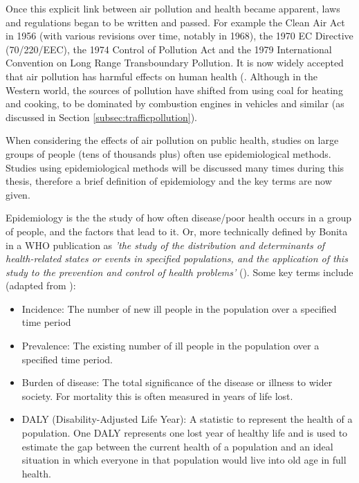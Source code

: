 
Once this explicit link between air pollution and health became apparent, laws and regulations began to be written and passed. For example the Clean Air Act in 1956 (with various revisions over time, notably in 1968), the 1970 EC Directive (70/220/EEC), the 1974 Control of Pollution Act and the 1979 International Convention on Long Range Transboundary Pollution.
It is now widely accepted that air pollution has harmful effects on human health (\cite{WorldHealthOrganization2013}. Although in the Western world, the sources of pollution have shifted from using coal for heating and cooking, to be dominated by combustion engines in vehicles and similar (as discussed in Section \ref{subsec:trafficpollution}).


When considering the effects of air pollution on public health, studies on large groups of people (tens of thousands plus) often use epidemiological methods. Studies using epidemiological methods will be discussed many times during this thesis, therefore a brief definition of epidemiology and the key terms are now given.

Epidemiology is the the study of how often disease/poor health occurs in a group of people, and the factors that lead to it. Or, more technically defined by Bonita in a WHO publication as \textit{'the study of the distribution and determinants of health-related states or events in specified populations, and the application of this study to the prevention and control of health problems'} (\cite{Bonita2006}). Some key terms include (adapted from \cite{U.S.DepartmentofHealth&HumanServices2014}):

\begin{itemize}
\item Incidence: The number of new ill people in the population over a specified time period
\item Prevalence: The existing number of ill people in the population over a specified time period.
\item Burden of disease: The total significance of the disease or illness to wider society. For mortality this is often measured in years of life lost.
\item DALY (Disability-Adjusted Life Year): A statistic to represent the health of a population. One DALY represents one lost year of healthy life and is used to estimate the gap between the current health of a population and an ideal situation in which everyone in that population would live into old age in full health.
\end{itemize}

